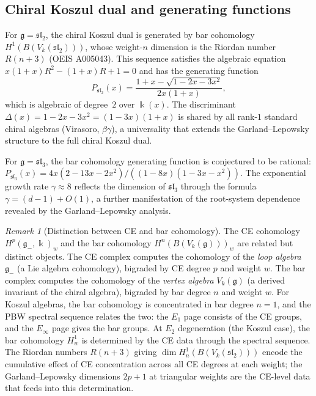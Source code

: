 \documentclass[11pt,reqno]{amsart}
\theoremstyle{plain}
\theoremstyle{definition}
\theoremstyle{remark}
\newtheorem{remark}[theorem]{Remark}
\newcommand{\fg}{\mathfrak{g}}
\newcommand{\gminus}{\fg_{-}}
\newcommand{\kk}{\Bbbk}
\begin{document}
\subsection{Chiral Koszul dual and generating functions}

For $\fg = \mathfrak{sl}_2$, the chiral Koszul dual is generated by bar
cohomology $H^1(B(V_k(\mathfrak{sl}_2)))$, whose weight-$n$ dimension is
the Riordan number $R(n+3)$ (OEIS A005043). This sequence satisfies the
algebraic equation $x(1+x)R^2 - (1+x)R + 1 = 0$ and has the generating
function
\[
 P_{\mathfrak{sl}_2}(x) = \frac{1 + x - \sqrt{1 - 2x - 3x^2}}{2x(1+x)},
\]
which is algebraic of degree~$2$ over $\kk(x)$. The discriminant
$\Delta(x) = 1 - 2x - 3x^2 = (1 - 3x)(1+x)$ is shared by all rank-$1$
standard chiral algebras (Virasoro, $\beta\gamma$), a universality that
extends the Garland--Lepowsky structure to the full chiral Koszul dual.

For $\fg = \mathfrak{sl}_3$, the bar cohomology generating function is
conjectured to be rational:
$P_{\mathfrak{sl}_3}(x) = 4x(2 - 13x - 2x^2)/((1-8x)(1-3x-x^2))$.
The exponential growth rate $\gamma \approx 8$ reflects the dimension
of $\mathfrak{sl}_3$ through the formula $\gamma = (d-1) + O(1)$, a
further manifestation of the root-system dependence revealed by
the Garland--Lepowsky analysis.

\begin{remark}[Distinction between CE and bar cohomology]\label{rem:CE-vs-bar}
 The CE cohomology $H^p(\gminus, \kk)_w$ and the bar cohomology
 $H^n(B(V_k(\fg)))_w$ are related but distinct objects. The CE
 complex computes the cohomology of the \emph{loop algebra} $\gminus$
 (a Lie algebra cohomology), bigraded by CE degree $p$ and weight $w$.
 The bar complex computes the cohomology of the \emph{vertex algebra}
 $V_k(\fg)$ (a derived invariant of the chiral algebra), bigraded by
 bar degree $n$ and weight $w$. For Koszul algebras, the bar
 cohomology is concentrated in bar degree $n = 1$, and the PBW
 spectral sequence relates the two: the $E_1$ page consists of the CE
 groups, and the $E_\infty$ page gives the bar groups. At $E_2$
 degeneration (the Koszul case), the bar cohomology $H^1_w$ is
 determined by the CE data through the spectral sequence. The Riordan
 numbers $R(n+3)$ giving $\dim H^1_n(B(V_k(\mathfrak{sl}_2)))$ encode
 the cumulative effect of CE concentration across all CE degrees at
 each weight; the Garland--Lepowsky dimensions $2p+1$ at triangular
 weights are the CE-level data that feeds into this determination.
\end{remark}
\end{document}
